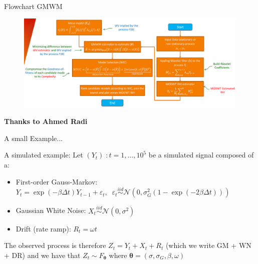 \documentclass[envcountsect,usenames,dvipsnames]{beamer}
\theoremstyle{mystyle}
\begin{document}

\begin{frame}{Flowchart GMWM}
	\begin{figure}
	    \centering
	  \includegraphics[width = 12cm]{Images/ahmed.pdf}
	\end{figure}
\scriptsize{\textbf{{\color{beamer@UIUCblue} Thanks to Ahmed Radi}}}
\end{frame}

\begin{frame}{A small Example...}
	\begin{exampleblock}{A simulated example:}
		Let $(Y_t) \; : t = 1, ... , 10^5$ be a simulated signal composed of a:
		\begin{itemize}
			\item First-order Gauss-Markov: $Y_{t} = \exp(-\beta \Delta t) Y_{t-1} + \varepsilon_t, \; \; \varepsilon_t \overset{iid}{\sim} \mathcal{N}\left(0, \sigma_{G}^2 \left(1 - \exp(-2 \beta \Delta t) \right) \right)$
			\item Gaussian White Noise: $X_{t} \overset{iid}{\sim} \mathcal{N}\left(0, \sigma^2 \right)$
			\item Drift (rate ramp): $R_{t} = \omega t$
		\end{itemize}
		The observed process is therefore $Z_t = Y_{t} + X_{t} + R_{t}$ (which we write GM + WN + DR) and we have that $Z_t \sim F_{\bm{\theta}}$ where $\bm{\theta} = \left( \sigma , \sigma_{G}, \beta, \omega \right)$
	\end{exampleblock}
\end{frame}
\end{document}
